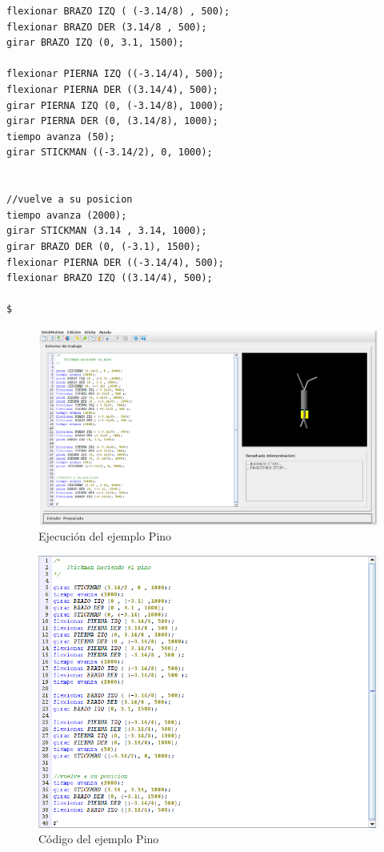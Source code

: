 \documentclass[a4paper, 12pt]{book}
\begin{document}
\begin{itemize}
\begin{verbatim}
flexionar BRAZO IZQ ( (-3.14/8) , 500);
flexionar BRAZO DER (3.14/8 , 500);
girar BRAZO IZQ (0, 3.1, 1500);

flexionar PIERNA IZQ ((-3.14/4), 500);
flexionar PIERNA DER ((3.14/4), 500);
girar PIERNA IZQ (0, (-3.14/8), 1000);
girar PIERNA DER (0, (3.14/8), 1000);
tiempo avanza (50);
girar STICKMAN ((-3.14/2), 0, 1000);


//vuelve a su posicion
tiempo avanza (2000);
girar STICKMAN (3.14 , 3.14, 1000);
girar BRAZO DER (0, (-3.1), 1500);
flexionar PIERNA DER ((-3.14/4), 500);
flexionar BRAZO IZQ ((3.14/4), 500);

$
\end{verbatim}



\begin{figure}[htb]
  \centerline{\includegraphics[width=\textwidth]{./imagenes/pino1.png}}
  \caption{Ejecución del ejemplo Pino}
\end{figure}


\begin{figure}[htb]
  \centerline{\includegraphics[width=\textwidth]{./imagenes/pino1-codigo.png}}
  \caption{Código del ejemplo Pino}
\end{figure}



\end{itemize}
\end{document}
